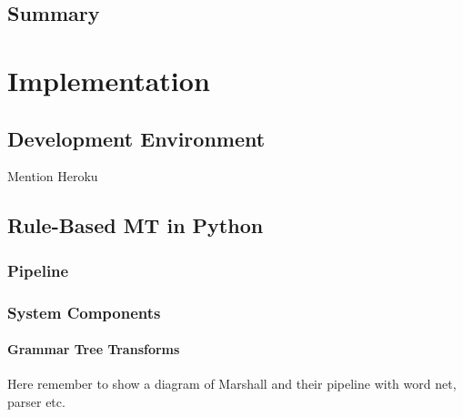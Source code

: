 \documentclass[12pt]{ociamthesis}  %
\begin{document}
\section{Summary}



\chapter{Implementation}
\label{implementation}

\section{Development Environment}
Mention Heroku

\section{Rule-Based MT in Python}
\label{RBMT}
	\subsection{Pipeline}
	\subsection{System Components}
		\subsubsection{Grammar Tree Transforms}
		Here remember to show a diagram of Marshall and their pipeline with word net, parser etc.
\end{document}
